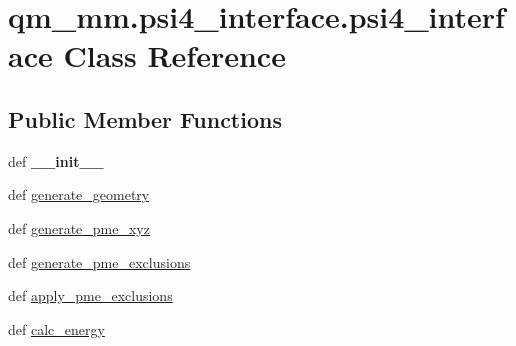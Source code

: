 \hypertarget{classqm__mm_1_1psi4__interface_1_1psi4__interface}{\section{qm\-\_\-mm.\-psi4\-\_\-interface.\-psi4\-\_\-interface Class Reference}
\label{classqm__mm_1_1psi4__interface_1_1psi4__interface}
}
\subsection*{Public Member Functions}
\begin{DoxyCompactItemize}
\item 
\hypertarget{classqm__mm_1_1psi4__interface_1_1psi4__interface_a5a8ed32b1b42bb5fb6aa7289b5759cb2}{def {\bfseries \-\_\-\-\_\-init\-\_\-\-\_\-}}\label{classqm__mm_1_1psi4__interface_1_1psi4__interface_a5a8ed32b1b42bb5fb6aa7289b5759cb2}

\item 
def \hyperlink{classqm__mm_1_1psi4__interface_1_1psi4__interface_a660fd7e726174d2bba77c9e162e620ea}{generate\-\_\-geometry}
\item 
def \hyperlink{classqm__mm_1_1psi4__interface_1_1psi4__interface_aee7153d3d7f9c5d3fc412331f87d3554}{generate\-\_\-pme\-\_\-xyz}
\item 
def \hyperlink{classqm__mm_1_1psi4__interface_1_1psi4__interface_a75c8238500fa9969d6b6f0495e2f879f}{generate\-\_\-pme\-\_\-exclusions}
\item 
def \hyperlink{classqm__mm_1_1psi4__interface_1_1psi4__interface_a1fcae35bb87bc0d9f12b013c0f6dc107}{apply\-\_\-pme\-\_\-exclusions}
\item 
def \hyperlink{classqm__mm_1_1psi4__interface_1_1psi4__interface_a5deae90102d64f40346e1d462248b08b}{calc\-\_\-energy}
\end{DoxyCompactItemize}
